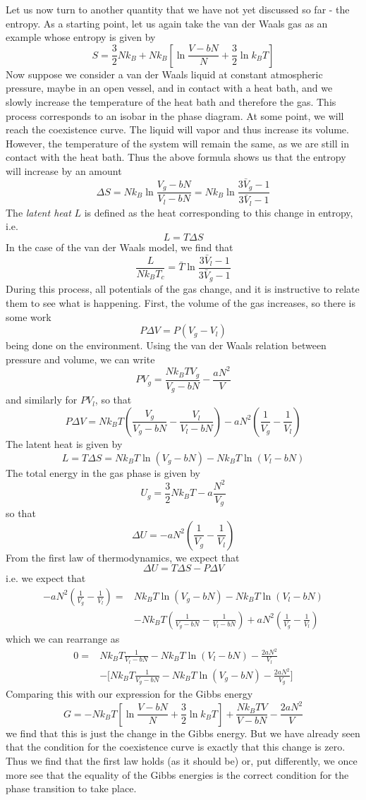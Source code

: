 \documentclass[a4paper, draft]{article}
\theoremstyle{own}
\theoremstyle{remark}
\begin{document}
Let us now turn to another quantity that we have not yet discussed so far - the entropy. As a starting point, let us again take the van der Waals gas as an example whose entropy is given by
$$
S = \frac{3}{2} N k_B + 
N k_B [\ln \frac{V-bN}{N} + \frac{3}{2} \ln k_B T]
$$
Now suppose we consider a van der Waals liquid at constant atmospheric pressure, maybe in an open vessel, and in contact with a heat bath, and we slowly increase the temperature of the heat bath and therefore the gas. This process corresponds to an isobar in the phase diagram. At some point, we will reach the coexistence curve. The liquid will vapor and thus increase its volume. However, the temperature of the system will remain the same, as we are still in contact with the heat bath. Thus the above formula shows us that the entropy will increase by an amount
$$
\Delta S = N k_B \ln \frac{V_{g}-bN}{V_{l}-bN} = N k_B \ln \frac{3 \bar{V}_{g} - 1}{3 \bar{V}_{l}- 1}
$$
The {\em latent heat} $L$ is defined as the heat corresponding to this change in entropy, i.e. 
$$
L = T \Delta S
$$
In the case of the van der Waals model, we find that
$$
\frac{L}{N k_B T_c} = \bar{T}  \ln \frac{3 \bar{V}_{l} - 1}{3 \bar{V}_{g}- 1}
$$
During this process, all potentials of the gas change, and it is instructive to relate them to see what is happening. First, the volume of the gas increases, so there is some work
$$
P \Delta V = P (V_g - V_l) 
$$
being done on the environment. Using the van der Waals relation between pressure and volume, we can write
$$
P V_g = \frac{N k_B T V_g}{V_g - bN} - \frac{aN^2}{V}
$$
and similarly for $P V_l$, so that
$$
P \Delta V = N k_B T (\frac{V_g}{V_g - bN} - \frac{V_l}{V_l - bN}) - a N^2 (\frac{1}{V_g} - \frac{1}{V_l})
$$
The latent heat is given by
$$
L = T \Delta S = N k_B T \ln (V_{g}-bN) - N k_B T \ln (V_{l}-bN)
$$
The total energy in the gas phase is given by
$$
U_g =  \frac{3}{2} N k_B T - a \frac{N^2}{V_g}
$$
so that
$$
\Delta U = - aN^2  (\frac{1}{V_g} - \frac{1}{V_l})
$$
From the first law of thermodynamics, we expect that
$$
\Delta U = T \Delta S - P \Delta V
$$
i.e. we expect that
\begin{align*}
	- aN^2  (\frac{1}{V_g} - \frac{1}{V_l})=&    N k_B T \ln (V_{g}-bN) - N k_B T \ln (V_{l}-bN) \\
&-  N k_B T (\frac{1}{V_g - bN} - \frac{1}{V_l - bN}) + a N^2 (\frac{1}{V_g} - \frac{1}{V_l}) 
\end{align*}
which we can rearrange as
\begin{align*}
	0 =&     N k_B T  \frac{1}{V_l - bN} - N k_B T \ln (V_{l}-bN) -  \frac{2a N^2}{V_l} \\
	& -  \big[ N k_B T \frac{1}{V_g - bN}  - N k_B T \ln (V_{g}-bN)-  \frac{2a N^2}{V_g}    \big]
\end{align*}
Comparing this with our expression for the Gibbs energy
$$
G =  - N k_B T [ \ln\frac{V-bN}{N} + \frac{3}{2} \ln k_B T] + \frac{N k_B TV}{V-bN} 
-\frac{2aN^2}{V	}
$$
we find that this is just the change in the Gibbs energy. But we have already seen that the condition for the coexistence curve is exactly that this change is zero. Thus we find that the first law holds (as it should be) or, put differently, we once more see that the equality of the Gibbs energies is the correct condition for the phase transition to take place. 
\end{document}
